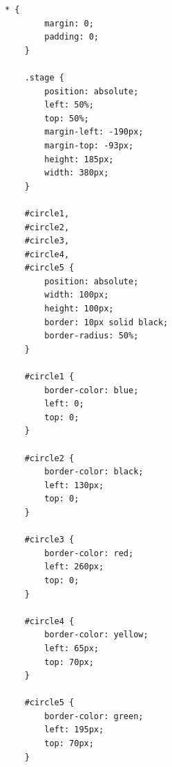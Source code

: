 \begin{lstlisting}[style=htmlcssjs, title=olympic.css]
* {
        margin: 0;
        padding: 0;
    }
    
    .stage {
        position: absolute;
        left: 50%;
        top: 50%;
        margin-left: -190px;
        margin-top: -93px;
        height: 185px;
        width: 380px;
    }
    
    #circle1,
    #circle2,
    #circle3,
    #circle4,
    #circle5 {
        position: absolute;
        width: 100px;
        height: 100px;
        border: 10px solid black;
        border-radius: 50%;
    }
    
    #circle1 {
        border-color: blue;
        left: 0;
        top: 0;
    }
    
    #circle2 {
        border-color: black;
        left: 130px;
        top: 0;
    }
    
    #circle3 {
        border-color: red;
        left: 260px;
        top: 0;
    }
    
    #circle4 {
        border-color: yellow;
        left: 65px;
        top: 70px;
    }
    
    #circle5 {
        border-color: green;
        left: 195px;
        top: 70px;
    }
\end{lstlisting}

\newpage